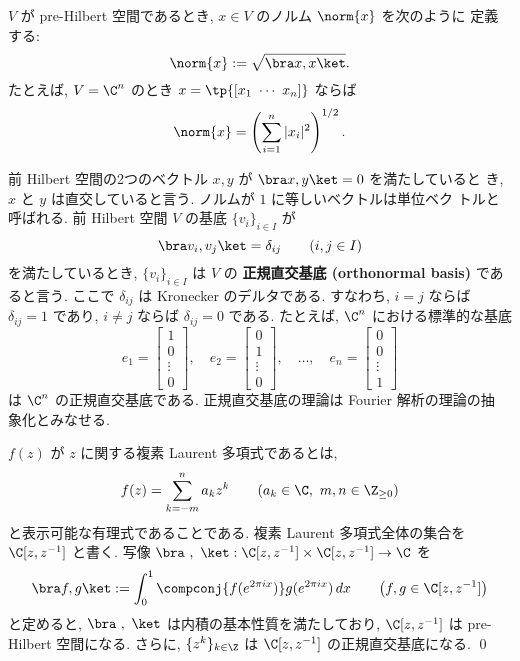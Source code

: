\documentclass[12pt,twoside]{jarticle}
\begin{document}
$V$ が pre-Hilbert 空間であるとき, $x\in V$ のノルム $\norm{x}$ を次のように
定義する:
\begin{equation*}
  \norm{x} := \sqrt{\bra x, x \ket}.
\end{equation*}
たとえば, $V=\C^n$ のとき $x = \tp{[x_1\ \cdots\ x_n]}$ ならば
\begin{equation*}
  \norm{x} = \left(\sum_{i=1}^n|x_i|^2\right)^{1/2}.
\end{equation*}

前 Hilbert 空間の2つのベクトル $x,y$ が $\bra x, y\ket = 0$ を満たしていると
き, $x$ と $y$ は直交していると言う. ノルムが $1$ に等しいベクトルは単位ベク
トルと呼ばれる. 前 Hilbert 空間 $V$ の基底 $\{v_i\}_{i\in I}$ が
\begin{equation*}
  \bra v_i, v_j \ket = \delta_{ij} \qquad (i,j\in I)
\end{equation*}
を満たしているとき,  $\{v_i\}_{i\in I}$ は $V$ の
{\bf 正規直交基底 (orthonormal basis)} であると言う.
ここで $\delta_{ij}$ は Kronecker のデルタである.
すなわち, $i=j$ ならば $\delta_{ij}=1$ であり, 
$i\ne j$ ならば $\delta_{ij}=0$ である.
たとえば, $\C^n$ における標準的な基底
\begin{equation*}
  e_1 =
  \begin{bmatrix}
    1 \\ 0 \\ \vdots \\ 0
  \end{bmatrix},
  \quad
  e_2 =
  \begin{bmatrix}
    0 \\ 1 \\ \vdots \\ 0
  \end{bmatrix},
  \quad
  \dots,
  \quad
  e_n =
  \begin{bmatrix}
    0 \\ 0 \\ \vdots \\ 1
  \end{bmatrix}
\end{equation*}
は $\C^n$ の正規直交基底である.  正規直交基底の理論は Fourier 解析の理論の抽
象化とみなせる.


\begin{question}
  $f(z)$ が $z$ に関する複素 Laurent 多項式であるとは,
  \begin{equation*}
    f(z) = \sum_{k=-m}^n a_k z^k
    \qquad (a_k\in\C,\ m,n\in\Z_{\ge0})
  \end{equation*}
  と表示可能な有理式であることである. 
  複素 Laurent 多項式全体の集合を $\C[z,z^{-1}]$ と書く. 
  写像 $\bra\ ,\ \ket : \C[z,z^{-1}]\times\C[z,z^{-1}]\to\C$ を
  \begin{equation*}
    \bra f, g\ket 
    := \int_0^1 \compconj{f(e^{2\pi i x})} g(e^{2\pi i x})\,dx
    \qquad \bigl(f,g\in\C[z,z^{-1}]\bigr)
  \end{equation*}
  と定めると, $\bra\ ,\ \ket$ は内積の基本性質を満たしており, 
  $\C[z,z^{-1}]$ は pre-Hilbert 空間になる. 
  さらに, $\{z^k\}_{k\in\Z}$ は $\C[z,z^{-1}]$ の正規直交基底になる.
  \qed
\end{question}
\end{document}

